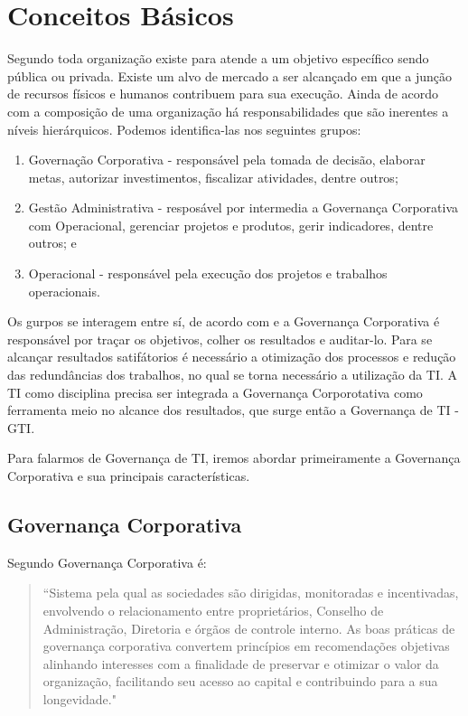 \section{Conceitos Básicos} \label{first:figs}

 Segundo \cite{adm} toda organização existe para atende a um objetivo específico sendo pública ou privada. Existe um alvo de mercado a ser alcançado em que a junção de recursos físicos e humanos contribuem para sua execução. Ainda de acordo com \cite{adm} a composição de uma organização há responsabilidades que são inerentes a níveis hierárquicos. Podemos identifica-las nos seguintes grupos: 

\begin{enumerate}
\item Governação Corporativa - responsável pela tomada de decisão, elaborar metas, autorizar investimentos, fiscalizar atividades, dentre outros;
\item Gestão Administrativa - resposável por intermedia a Governança Corporativa com Operacional, gerenciar projetos e produtos, gerir indicadores, dentre outros; e
\item Operacional - responsável pela execução dos projetos e trabalhos operacionais.
\end{enumerate}

Os gurpos se interagem entre sí, de acordo com \cite{IBGC} e \cite{ImplantandoGTI:2012} a Governança Corporativa é responsável por traçar os objetivos, colher os resultados e auditar-lo. Para se alcançar resultados satifátorios é necessário a otimização dos processos e redução das redundâncias dos trabalhos, no qual se torna necessário a utilização da TI. A TI como disciplina precisa ser integrada a Governança Corporotativa como ferramenta meio no alcance dos resultados, que surge então a Governança de TI - GTI.
 
Para falarmos de Governança de TI, iremos abordar primeiramente a Governança Corporativa e sua principais características.

\subsection{Governança Corporativa}
Segundo \cite{IBGC} Governança Corporativa é:

\begin{quote}
	``Sistema pela qual as sociedades são dirigidas, monitoradas e incentivadas, envolvendo o relacionamento entre proprietários, Conselho de Administração, Diretoria e órgãos de controle interno. As boas práticas de governança corporativa convertem princípios em recomendações objetivas alinhando interesses com a finalidade de preservar e otimizar o valor da organização, facilitando seu acesso ao capital e contribuindo para a sua longevidade." \cite[p.17]{IBGC}
\end{quote}


